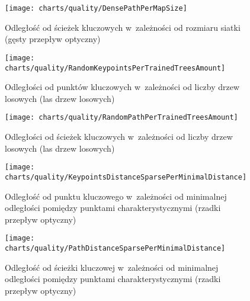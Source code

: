     \begin{figure}[!ht]
      \centering
      \texttt{[image: charts/quality/DensePathPerMapSize]}
      \caption[Odległość od ścieżek kluczowych w~zależności od rozmiaru siatki]
              {Odległość od ścieżek kluczowych w~zależności od rozmiaru siatki (gęsty przepływ optyczny)}
      \label{fig:DensePathPerMapSize}
    \end{figure}

    \newpage
    \begin{figure}[!ht]
      \centering
      \texttt{[image: charts/quality/RandomKeypointsPerTrainedTreesAmount]}
      \caption[Odległości od punktów kluczowych w~zależności od liczby drzew losowych]
              {Odległości od punktów kluczowych w~zależności od liczby drzew losowych (las drzew losowych)}
      \label{fig:RandomKeypointsPerTrainedTreesAmount}
    \end{figure}

    \begin{figure}[!ht]
      \centering
      \texttt{[image: charts/quality/RandomPathPerTrainedTreesAmount]}
      \caption[Odległości od ścieżek kluczowych w~zależności od liczby drzew losowych]
              {Odległości od ścieżek kluczowych w~zależności od liczby drzew losowych (las drzew losowych)}
      \label{fig:RandomPathPerTrainedTreesAmount}
    \end{figure}

    \newpage
    \begin{figure}[!ht]
      \centering
      \texttt{[image: charts/quality/KeypointsDistanceSparsePerMinimalDistance]}
      \caption[Odległość od punktu kluczowego w~zależności od minimalnej odległości pomiędzy punktami charakterystycznymi]
              {Odległość od punktu kluczowego w~zależności od minimalnej odległości pomiędzy punktami charakterystycznymi (rzadki przepływ optyczny)}
      \label{fig:SpecialisedSparseKeypointsDistance}
    \end{figure}

    \begin{figure}[!ht]
      \centering
      \texttt{[image: charts/quality/PathDistanceSparsePerMinimalDistance]}
      \caption[Odległość od ścieżki kluczowej w~zależności od minimalnej odległości pomiędzy punktami charakterystycznymi]
              {Odległość od ścieżki kluczowej w~zależności od minimalnej odległości pomiędzy punktami charakterystycznymi (rzadki przepływ optyczny)}
      \label{fig:SpecialisedSparsePathDistance}
    \end{figure}

